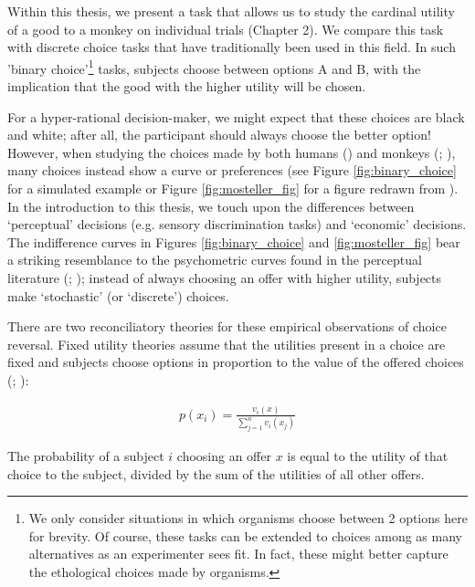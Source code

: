 Within this thesis, we present a task that allows us to study the cardinal utility of a good to a monkey on individual trials (Chapter 2). We compare this task with discrete choice tasks that have traditionally been used in this field. In such 'binary choice'\footnote{We only consider situations in which organisms choose between 2 options here for brevity. Of course, these tasks can be extended to choices among as many alternatives as an experimenter sees fit. In fact, these might better capture the ethological choices made by organisms.} tasks, subjects choose between options A and B, with the implication that the good with the higher utility will be chosen.

For a hyper-rational decision-maker, we might expect that these choices are black and white; after all, the participant should always choose the better option! However, when studying the choices made by both humans (\cite{mostellerExperimentalMeasurementUtility1951}) and monkeys (\cite{ferraritonioloNonhumanPrimatesSatisfy2021}; \cite{pastorMonkeysChooseIf2017}), many choices instead show a curve or preferences (see Figure \ref{fig:binary_choice} for a simulated example or Figure \ref{fig:mosteller_fig} for a figure redrawn from \cite{mostellerExperimentalMeasurementUtility1951}). In the introduction to this thesis, we touch upon the differences between ‘perceptual’ decisions (e.g. sensory discrimination tasks) and ‘economic’ decisions. The indifference curves in Figures \ref{fig:binary_choice} and \ref{fig:mosteller_fig} bear a striking resemblance to the psychometric curves found in the perceptual literature (\cite{kleinMeasuringEstimatingUnderstanding2001}; \cite{rieskampExtendingBoundsRationality2006}); instead of always choosing an offer with higher utility, subjects make ‘stochastic’ (or ‘discrete’) choices.

There are two reconciliatory theories for these empirical observations of choice reversal. Fixed utility theories assume that the utilities present in a choice are fixed and subjects choose options in proportion to the value of the offered choices (\cite{lucePossiblePsychophysicalLaws1959}; \cite{tverskyEliminationAspectsTheory1972}):

\begin{align}
p(x_i) = \frac{v_i(x)}{\sum_{j=1}^{n} v_i(x_j)}
\label{eq:utility_choice}
\end{align}

The probability of a subject $i$ choosing an offer $x$ is equal to the utility of that choice to the subject, divided by the sum of the utilities of all other offers.

